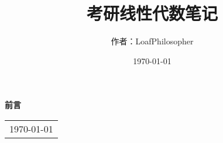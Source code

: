 \title{{\Huge{\textbf{考研线性代数笔记}}}}
\author{作者：LoafPhilosopher }
\date{\today}
\maketitle                   %

\thispagestyle{empty}        %
\begin{center}
	\Huge\textbf{前言}
\end{center}

\begin{flushright}
	\begin{tabular}{c}
		\today \newline 
	\end{tabular}
\end{flushright}

\newpage                      %
\pagestyle{plain}             %
\setcounter{page}{1}          %
\begin{spacing}{1.5}
	\tableofcontents
\end{spacing}              %
\newpage                      %
\pagestyle{plain}
\setcounter{page}{1}          %
